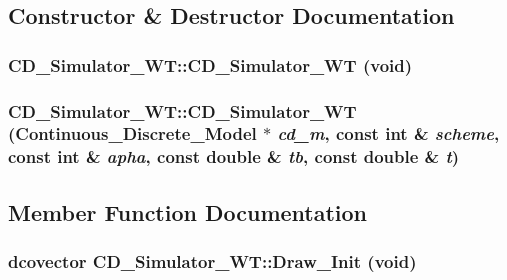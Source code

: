 \subsection{Constructor \& Destructor Documentation}
\hypertarget{class_c_d___simulator___w_t_83cf1b0723ca06211116b0478fa078b2}{
\subsubsection[{CD\_\-Simulator\_\-WT}]{\setlength{\rightskip}{0pt plus 5cm}CD\_\-Simulator\_\-WT::CD\_\-Simulator\_\-WT (void)}}
\label{class_c_d___simulator___w_t_83cf1b0723ca06211116b0478fa078b2}


\hypertarget{class_c_d___simulator___w_t_173ec7213417756a63b91f9a7f3d18fd}{
\subsubsection[{CD\_\-Simulator\_\-WT}]{\setlength{\rightskip}{0pt plus 5cm}CD\_\-Simulator\_\-WT::CD\_\-Simulator\_\-WT ({\bf Continuous\_\-Discrete\_\-Model} $\ast$ {\em cd\_\-m}, \/  const int \& {\em scheme}, \/  const int \& {\em apha}, \/  const double \& {\em tb}, \/  const double \& {\em t})}}
\label{class_c_d___simulator___w_t_173ec7213417756a63b91f9a7f3d18fd}




\subsection{Member Function Documentation}
\hypertarget{class_c_d___simulator___w_t_c05069bbef8e4ff83247f77476b2afe1}{
\subsubsection[{Draw\_\-Init}]{\setlength{\rightskip}{0pt plus 5cm}dcovector CD\_\-Simulator\_\-WT::Draw\_\-Init (void)}}
\label{class_c_d___simulator___w_t_c05069bbef8e4ff83247f77476b2afe1}


